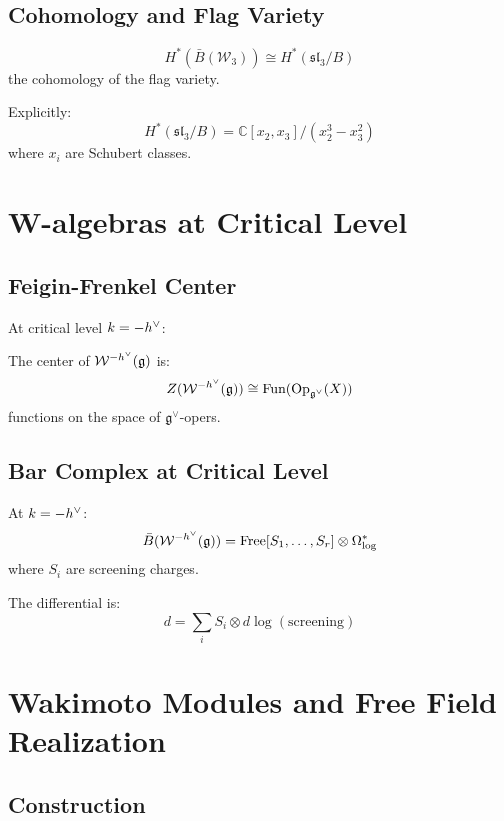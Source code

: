 \subsection{Cohomology and Flag Variety}

\begin{theorem}
$$H^*(\bar{B}(\mathcal{W}_3)) \cong H^*(\mathfrak{sl}_3/B)$$
the cohomology of the flag variety.
\end{theorem}

Explicitly:
$$H^*(\mathfrak{sl}_3/B) = \mathbb{C}[x_2, x_3]/(x_2^3 - x_3^2)$$
where $x_i$ are Schubert classes.

\section{W-algebras at Critical Level}

\subsection{Feigin-Frenkel Center}

At critical level $k = -h^\vee$:

\begin{theorem}
The center of $\mathcal{W}^{-h^\vee}(\mathfrak{g})$ is:
$$Z(\mathcal{W}^{-h^\vee}(\mathfrak{g})) \cong \text{Fun}(\text{Op}_{\mathfrak{g}^\vee}(X))$$
functions on the space of $\mathfrak{g}^\vee$-opers.
\end{theorem}

\subsection{Bar Complex at Critical Level}

\begin{theorem}
At $k = -h^\vee$:
$$\bar{B}(\mathcal{W}^{-h^\vee}(\mathfrak{g})) = \text{Free}[S_1, \ldots, S_r] \otimes \Omega^*_{\log}$$
where $S_i$ are screening charges.

The differential is:
$$d = \sum_i S_i \otimes d\log(\text{screening})$$
\end{theorem}

\section{Wakimoto Modules and Free Field Realization}

\subsection{Construction}

